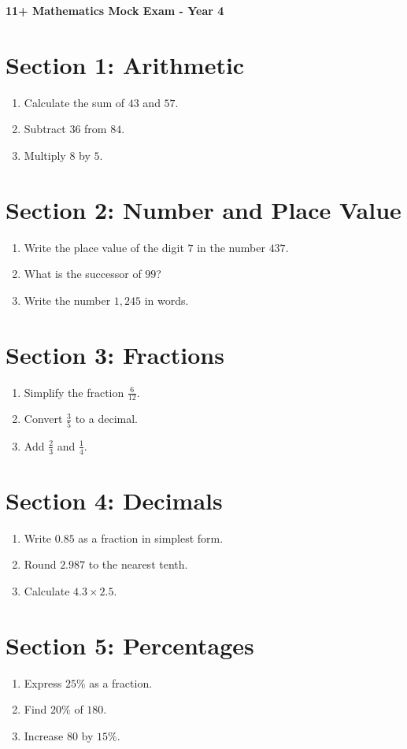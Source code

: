\documentclass[12pt]{article}
\begin{document}
\begin{center}
\textbf{11+ Mathematics Mock Exam - Year 4}
\end{center}

\section*{Section 1: Arithmetic}
\begin{enumerate}
  \item Calculate the sum of $43$ and $57$.
  \item Subtract $36$ from $84$.
  \item Multiply $8$ by $5$.
\end{enumerate}

\section*{Section 2: Number and Place Value}
\begin{enumerate}
  \item Write the place value of the digit $7$ in the number $437$.
  \item What is the successor of $99$?
  \item Write the number $1,245$ in words.
\end{enumerate}

\section*{Section 3: Fractions}
\begin{enumerate}
  \item Simplify the fraction $\frac{6}{12}$.
  \item Convert $\frac{3}{5}$ to a decimal.
  \item Add $\frac{2}{3}$ and $\frac{1}{4}$.
\end{enumerate}

\section*{Section 4: Decimals}
\begin{enumerate}
  \item Write $0.85$ as a fraction in simplest form.
  \item Round $2.987$ to the nearest tenth.
  \item Calculate $4.3 \times 2.5$.
\end{enumerate}

\section*{Section 5: Percentages}
\begin{enumerate}
  \item Express $25\%$ as a fraction.
  \item Find $20\%$ of $180$.
  \item Increase $80$ by $15\%$.
\end{enumerate}
\end{document}
